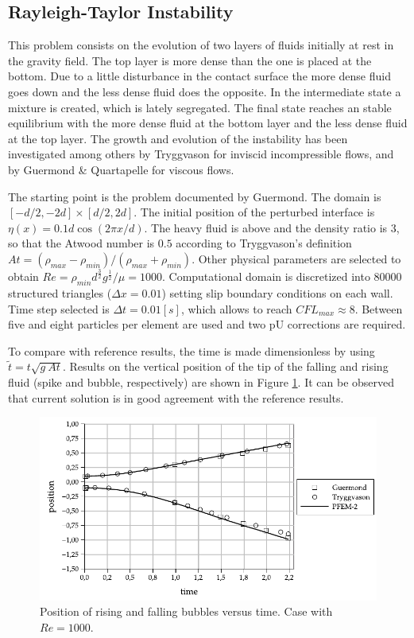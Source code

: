 \subsection{Rayleigh-Taylor Instability}

This problem consists on the evolution of two layers of fluids initially at rest in the gravity field. The top layer is more dense than the one is placed at the bottom. Due to a little disturbance in the contact surface the more dense fluid goes down and the less dense fluid does the opposite. In the intermediate state a mixture is created, which is lately segregated. The final state reaches an stable equilibrium with the more dense fluid at the bottom layer and the less dense fluid at the top layer. The growth and evolution of the instability has been investigated among others by Tryggvason\cite{Tryggvason88} for inviscid incompressible flows, and by Guermond
\& Quartapelle\cite{Guermond00} for viscous flows.

The starting point is the problem documented by Guermond. The domain is $[-d/2,-2d]\times[d/2,2d]$. The initial position of the perturbed interface is $\eta(x) = 0.1d \cos(2\pi x/d)$. The heavy fluid is above and the density ratio is $3$, so that the Atwood
number is $0.5$ according to Tryggvason's definition $At = (\rho_{max}-\rho_{min})/(\rho_{max}+\rho_{min})$. Other physical parameters are selected to obtain $Re=\rho_{min}d^{\frac{3}{2}}g^{\frac{1}{2}}/\mu=1000$. Computational domain is discretized into $80000$ structured triangles ($\Delta x=0.01$) setting slip boundary conditions on each wall. Time step selected is $\Delta t=0.01[s]$, which allows to reach $CFL_{max} \approx 8$. Between five and eight particles per element are used and two pU corrections are required.

To compare with reference results, the time is made dimensionless by using $\widetilde{t} = t\sqrt{g\ At}$. Results on the vertical position of the tip of the falling and rising fluid (spike and bubble, respectively) are shown in Figure \ref{fg:rayleigh-rf}. It can be observed that current solution is in good agreement with the reference results.

\begin{figure}[H]
  \begin{center}
      \includegraphics[width=\columnwidth]{images/rayleigh_1.pdf}
  \end{center}
  \caption{\label{fg:rayleigh-rf} Position of rising and falling bubbles versus time. Case with $Re=1000$.}
\end{figure}


